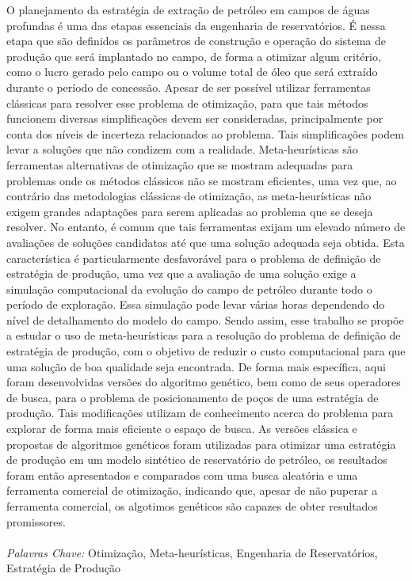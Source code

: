 \documentclass[Portugues,Final]{tese-FT}
\begin{document}
        
        \begin{resumo}
        O planejamento da estratégia de extração de petróleo em campos de águas profundas é uma das etapas essenciais da engenharia de reservatórios. É nessa etapa que são definidos os parâmetros de construção e operação do sistema de produção que será implantado no campo, de forma a otimizar algum critério, como o lucro gerado pelo campo ou o volume total de óleo que será extraído durante o período de concessão. Apesar de ser possível utilizar ferramentas clássicas para resolver esse problema de otimização, para que tais métodos funcionem diversas simplificações devem ser consideradas, principalmente por conta dos níveis de incerteza relacionados ao problema. Tais simplificações podem levar a soluções que não condizem com a realidade. Meta-heurísticas são ferramentas alternativas de otimização que se mostram adequadas para problemas onde os métodos clássicos não se mostram eficientes, uma vez que, ao contrário das metodologias clássicas de otimização, as meta-heurísticas não exigem grandes adaptações para serem aplicadas ao problema que se deseja resolver. No entanto, é comum que tais ferramentas exijam um elevado número de avaliações de soluções candidatas até que uma solução adequada seja obtida. Esta característica é particularmente desfavorável para o problema de definição de estratégia de produção, uma vez que a avaliação de uma solução exige a simulação computacional da evolução do campo de petróleo durante todo o período de exploração. Essa simulação pode levar várias horas dependendo do nível de detalhamento do modelo do campo. Sendo assim, esse trabalho se propõe a estudar o uso de meta-heurísticas para a resolução do problema de definição de estratégia de produção, com o objetivo de reduzir o custo computacional para que uma solução de boa qualidade seja encontrada. De forma mais específica, aqui foram desenvolvidas versões do algoritmo genético, bem como de seus operadores de busca, para o problema de posicionamento de poços de uma estratégia de produção. Tais modificações utilizam de conhecimento acerca do problema para explorar de forma mais eficiente o espaço de busca. As versões clássica e propostas de algoritmos genéticos foram utilizadas para otimizar uma estratégia de produção em um modelo sintético de reservatório de petróleo, os resultados foram então apresentados e comparados com uma busca aleatória e uma ferramenta comercial de otimização, indicando que, apesar de não puperar a ferramenta comercial, os algotimos genéticos são capazes de obter resultados promissores.
        \\ \\ 
        \textit{Palavras Chave:} Otimização, Meta-heurísticas, Engenharia de Reservatórios, Estratégia de Produção
        \end{resumo}
        
\end{document}

